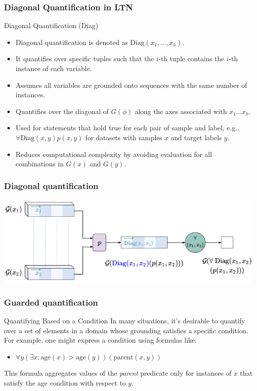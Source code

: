 \documentclass{beamer}
\begin{document}
\begin{frame}
\frametitle{Diagonal Quantification in LTN}
\begin{block}{Diagonal Quantification (Diag)}
\begin{itemize}
    \item Diagonal quantification is denoted as \( \text{Diag}(x_1, \ldots, x_h) \).
    \item It quantifies over specific tuples such that the \( i \)-th tuple contains the \( i \)-th instance of each variable.
    \item Assumes all variables are grounded onto sequences with the same number of instances.
    \item Quantifies over the diagonal of \( G(\phi) \) along the axes associated with \( x_1 \ldots x_h \).
    \item Used for statements that hold true for each pair of sample and label, e.g., \( \forall\text{Diag}(x, y) p(x, y) \) for datasets with samples \( x \) and target labels \( y \).
    \item Reduces computational complexity by avoiding evaluation for all combinations in \( G(x) \) and \( G(y) \).
\end{itemize}
\end{block}
\end{frame}

\begin{frame}
  \frametitle{Diagonal quantification}
  \includegraphics[width=\textwidth]{ltn4.png}
\end{frame}

\begin{frame}
\frametitle{Guarded quantification}
\begin{block}{Quantifying Based on a Condition}
In many situations, it's desirable to quantify over a set of elements
in a domain whose grounding satisfies a specific condition. For
example, one might express a condition using formulas like:
\begin{itemize}
    \item \( \forall y (\exists x : \text{age}(x) > \text{age}(y)) (\text{parent}(x, y)) \)
\end{itemize}
This formula aggregates values of the \textit{parent} predicate only for instances of \( x \) that satisfy the age condition with respect to \( y \).
\end{block}
\end{frame}
\end{document}
